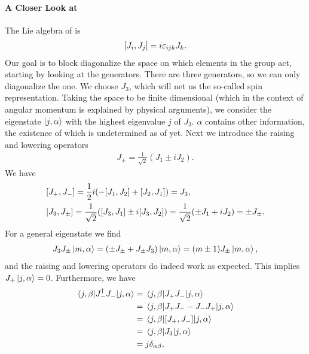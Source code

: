 \paragraph{A Closer Look at }
The Lie algebra of  is
\begin{align*}
	\comm{J_{i}}{J_{j}} = i\varepsilon_{ijk}J_{k}.
\end{align*}
Our goal is to block diagonalize the space on which elements in the group act, starting by looking at the generators. There are three generators, so we can only diagonalize the one. We choose $J_{3}$, which will net us the so-called spin representation. Taking the space to be finite dimensional (which in the context of angular momentum is explained by physical arguments), we consider the eigenstate $\ket{j, \alpha}$ with the highest eigenvalue $j$ of $J_{3}$. $\alpha$ contains other information, the existence of which is undetermined as of yet. Next we introduce the raising and lowering operators
\begin{align*}
	J_{\pm} = \frac{1}{\sqrt{2}}(J_{1} \pm iJ_{2}).
\end{align*}
We have
\begin{align*}
	&\comm{J_{+}}{J_{-}} = \frac{1}{2}i(-\comm{J_{1}}{J_{2}} + \comm{J_{2}}{J_{1}}) = J_{3}, \\
	&\comm{J_{3}}{J_{\pm}} = \frac{1}{\sqrt{2}}(\comm{J_{3}}{J_{1}} \pm i\comm{J_{3}}{J_{2}}) = \frac{1}{\sqrt{2}}(\pm J_{1} + iJ_{2}) = \pm J_{\pm}.
\end{align*}
For a general eigenstate we find
\begin{align*}
	J_{3}J_{\pm}\ket{m, \alpha} = (\pm J_{\pm} + J_{\pm}J_{3})\ket{m, \alpha} = (m \pm 1)J_{\pm}\ket{m, \alpha},
\end{align*}
and the raising and lowering operators do indeed work as expected. This implies $J_{+}\ket{j, \alpha} = 0$. Furthermore, we have
\begin{align*}
	\mel{j, \beta}{J_{-}\adj J_{-}}{j, \alpha} &= \mel{j, \beta}{J_{+}J_{-}}{j, \alpha} \\
                                               &= \mel{j, \beta}{J_{+}J_{-} - J_{-}J_{+}}{j, \alpha} \\
                                               &= \mel{j, \beta}{\comm{J_{+}}{J_{-}}}{j, \alpha} \\
                                               &= \mel{j, \beta}{J_{3}}{j, \alpha} \\
                                               &= j\delta_{\alpha\beta},
\end{align*}
